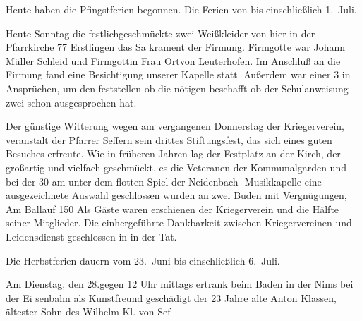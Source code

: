 

\pstart
{}%
Heute haben die Pfingstferien begonnen. Die Ferien\ob
von bis einschließlich 1.\ Juli.

%
Heute Sonntag die festlich\unsicher geschmückte zwei Weißkleider\unsicher\ob
von hier in der Pfarrkirche 77 Erstlingen\unsicher{} das Sa\ohb
krament der Firmung. Firmgotte war Johann Müller\ohb
Schleid und Firmgottin Frau Ort\unsicher von Leuterhofen.\ob
Im Anschluß an die Firmung fand eine Besichtigung\ob
unserer Kapelle statt. Außerdem war einer\unsicher{} 3\unsicher\ob
in Ansprüchen, um den\unsicher{} feststellen ob die nötigen\unsicher\ob
beschafft\unsicher{} ob der Schulanweisung\unsicher{} zwei schon\unsicher\ob
ausgesprochen hat.

%
Der günstige Witterung wegen am vergangenen\unsicher\ob
Donnerstag der Kriegerverein,\unsicher{} veranstalt\unsicher\ob
der Pfarrer Seffern sein drittes Stiftungsfest, das sich\ob
eines guten Besuches erfreute. Wie in früheren\ob
Jahren lag der Festplatz an der Kirch\unsicher, der großartig\ob
\unsicher und vielfach geschmückt.\unsicher{} es die Veteranen\ob
der Kommunalgarden und bei der 30\unsicher{} am unter\ob
dem flotten Spiel der Neidenbach- Musikkapelle\ob
eine ausgezeichnete Auswahl\unsicher{} geschlossen wurden\ob
an zwei Buden mit Vergnügungen,\unsicher{} Am\ob
Ball\unsicher auf 150\unsicher{} Als Gäste waren erschienen\ob
der Kriegerverein\unsicher{} und die Hälfte seiner\ob
Mitglieder. Die einhergeführte Dankbarkeit zwischen\ob
Kriegervereinen und Leidensdienst geschlossen in\unsicher\ob
\unsicher in der Tat.

%
Die Herbstferien dauern vom 23.\ Juni bis\ob
einschließlich 6.\ Juli.

%
Am Dienstag, den 28.\unsicher gegen 12 Uhr mittags ertrank\ob
beim Baden in der Nims bei\unsicher{} der Ei\ohb
senbahn\unsicher{} als Kunstfreund geschädigt der 23 Jahre alte\ob
Anton Klassen, ältester Sohn des Wilhelm Kl. von Sef-
\pend
